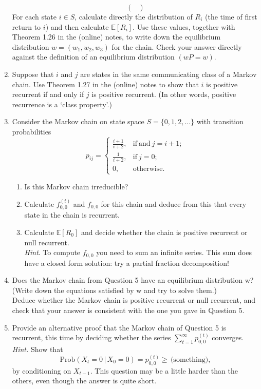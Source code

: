 \documentclass[11pt,a4paper]{article}
\begin{document}
\begin{enumerate}
$$\begin{pmatrix}
      \end{pmatrix}
      $$
      For each state $i \in S$, calculate directly the distribution of $R_i$ (the time of first return to $i$) and then calculate $\mathbb{E}[R_i]$. Use these values, together with Theorem 1.26 in the (online) notes, to write down the equilibrium distribution $w = (w_1, w_2, w_3)$ for the chain. Check your answer directly against the definition of an equilibrium distribution $(wP = w)$.
      \item Suppose that $i$ and $j$ are states in the same communicating class of a Markov chain. Use Theorem 1.27 in the (online) notes to show that $i$ is positive recurrent if and only if $j$ is positive recurrent. (In other words, positive recurrence is a ‘class property’.)
      \item Consider the Markov chain on state space $S = \{0, 1, 2, \ldots\}$ with transition probabilities
      $$
      p_{ij}
      =
      \begin{cases}
        \frac{i+1}{i+2}, & \text{if}\ \text{and}\ j =i + 1;\\
        \frac{1}{i+2}, & \text{if}\ j = 0;\\
        0, & \text{otherwise}.
      \end{cases}
      $$
      \begin{enumerate}
        \item Is this Markov chain irreducible?
        \item  Calculate $f^{(t)}_{0,0}$ and $f_{0,0}$ for this chain and deduce from this that every state in the chain is recurrent.
        \item Calculate $\mathbb{E}[R_0]$ and decide whether the chain is positive recurrent or null recurrent.\\
        \textit{Hint}. To compute $f_{0,0}$ you need to sum an infinite series. This sum does have a closed form solution: try a partial fraction decomposition!
      \end{enumerate}
      \item Does the Markov chain from Question 5 have an equilibrium distribution w? (Write down the equations satisfied by w and try to solve them.)\\
      Deduce whether the Markov chain is positive recurrent or null recurrent, and check that your answer is consistent with the one you gave in Question 5.
      \item Provide an alternative proof that the Markov chain of Question 5 is recurrent,
      this time by deciding whether the series $\sum_{t=1}^\infty p_{0,0}^{(t)}$ converges.\\
      \textit{Hint.} Show that
      $$\text{Prob}(X_t = 0 \, |\,  X_0 = 0) = p^{(t)}_{0,0} \geq \, \text{(something)},$$
      by conditioning on $X_{t−1}$. This question may be a little harder than the others, even though the answer is quite short.

    \end{enumerate}
\end{document}
